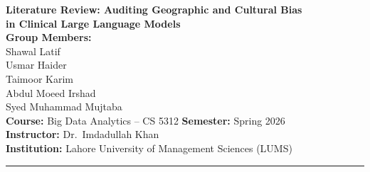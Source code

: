\documentclass[12pt,a4paper]{article}
\begin{document}
\begin{center}
{\LARGE \textbf{Literature Review: Auditing Geographic and Cultural Bias\\[0.4em]
in Clinical Large Language Models}}\\[1.8em]
{\large \textbf{Group Members:}}\\[0.6em]
Shawal Latif\\
Usmar Haider\\
Taimoor Karim\\
Abdul Moeed Irshad\\
Syed Muhammad Mujtaba\\[1.2em]
\textbf{Course:} Big Data Analytics -- CS 5312 \qquad
\textbf{Semester:} Spring 2026\\
\textbf{Instructor:} Dr.\ Imdadullah Khan\\
\textbf{Institution:} Lahore University of Management Sciences (LUMS)
\end{center}

\vspace{0.8em}\hrule\vspace{0.8em}

\begin{abstract}
This literature review surveys fourteen papers at the intersection of clinical
artificial intelligence, algorithmic fairness, and large language model (LLM)
evaluation, collectively motivating a systematic audit of geographic and cultural
bias in clinical LLMs. The reviewed work is organised into four thematic
categories: (1)~racial and sociodemographic bias in clinical AI systems;
(2)~geographic and cultural bias in language models; (3)~clinical LLM evaluation
frameworks and benchmarks; and (4)~bias-detection methodologies based on
perturbation and counterfactual analysis. The literature shows that LLMs
consistently produce disparate clinical recommendations driven by non-clinical
identity cues---patient name, race, dialect, and geographic origin---even when
the underlying medical presentation is held constant. Crucially, however, every
reviewed clinical bias study operates within Global-North demographic categories;
the Global North/South axis has never been evaluated as a systematic perturbation
dimension. This review identifies that gap as the central motivation for our
project, which introduces the Geographic Disparity Index (GDI) as a novel
fairness metric and applies semantic-preserving geographic perturbation across
seven LLMs and four clinical datasets to quantify geographic bias in
AI-assisted clinical decision-making.
\end{abstract}
\end{document}
